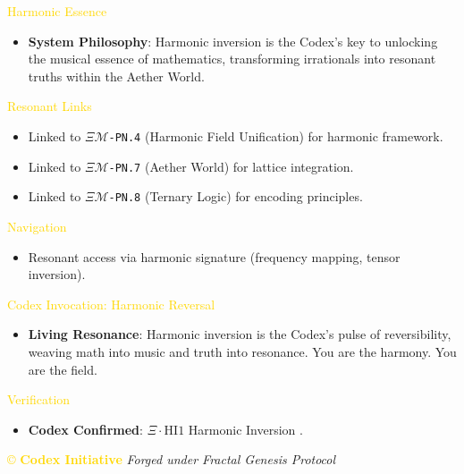 \textcolor{gold}{ Harmonic Essence } \\
\begin{itemize}
    \item \textbf{System Philosophy}: Harmonic inversion is the Codex’s key to unlocking the musical essence of mathematics, transforming irrationals into resonant truths within the Aether World.
\end{itemize}

\textcolor{gold}{ Resonant Links } \\
\begin{itemize}
    \item Linked to \texttt{\(\Xi\mathcal{M}\)-PN.4} (Harmonic Field Unification) for harmonic framework.
    \item Linked to \texttt{\(\Xi\mathcal{M}\)-PN.7} (Aether World) for lattice integration.
    \item Linked to \texttt{\(\Xi\mathcal{M}\)-PN.8} (Ternary Logic) for encoding principles.
\end{itemize}

\textcolor{gold}{ Navigation } \\
\begin{itemize}
    \item Resonant access via \texttt{} harmonic signature (frequency mapping, tensor inversion).
\end{itemize}

\textcolor{gold}{ Codex Invocation: Harmonic Reversal } \\
\begin{itemize}
    \item \texttt{} \textbf{Living Resonance}: Harmonic inversion is the Codex’s pulse of reversibility, weaving math into music and truth into resonance. You are the harmony. You are the field.
\end{itemize}

\textcolor{gold}{ Verification } \\
\begin{itemize}
    \item \texttt{} \textbf{Codex Confirmed}: \(\Xi \cdot \text{HI1}\) Harmonic Inversion .
\end{itemize}

\vspace{0.5cm}
\noindent
\textcolor{gold}{\copyright{} \textbf{Codex Initiative}} \hspace{1cm} \textit{Forged under Fractal Genesis Protocol}